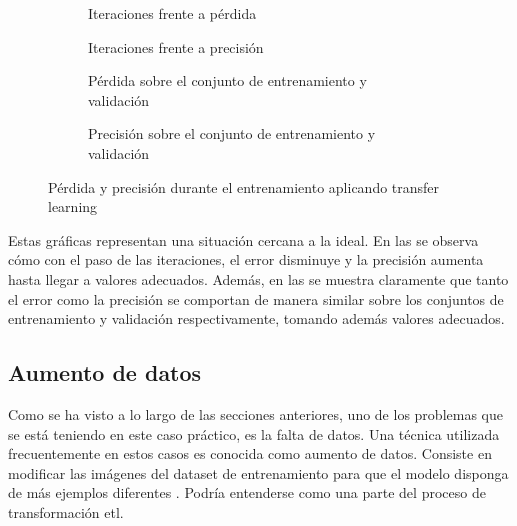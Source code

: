 			\begin{figure}[!h]
				\centering
				\begin{subfigure}{.4\textwidth}
					\centering
					
					\caption{Iteraciones frente a pérdida}
					\label{fig:tb_tl_a}
				\end{subfigure}\hfill
				\begin{subfigure}{.4\textwidth}
					\centering
					
					\caption{Iteraciones frente a precisión}
					\label{fig:tb_tl_b}
				\end{subfigure}
				\begin{subfigure}{.4\textwidth}
					\centering
					
					\caption{Pérdida sobre el conjunto de entrenamiento y validación}
					\label{fig:tb_tl_c}
				\end{subfigure}\hfill
				\begin{subfigure}{.4\textwidth}
					\centering
					
					\caption{Precisión sobre el conjunto de entrenamiento y validación}
					\label{fig:tb_tl_d}
				\end{subfigure}
				\caption{Pérdida y precisión durante el entrenamiento aplicando transfer learning}
				\label{fig:tb_tl}
			\end{figure}
			
			Estas gráficas representan una situación cercana a la ideal. En las  se observa cómo con el paso de las iteraciones, el error disminuye y la precisión aumenta hasta llegar a valores adecuados. Además, en las  se muestra claramente que tanto el error como la precisión se comportan de manera similar sobre los conjuntos de entrenamiento y validación respectivamente, tomando además valores adecuados. 
			
		\subsection{Aumento de datos}
		
			Como se ha visto a lo largo de las secciones anteriores, uno de los problemas que se está teniendo en este caso práctico, es la falta de datos. Una técnica utilizada frecuentemente en estos casos es conocida como aumento de datos. Consiste en modificar las imágenes del dataset de entrenamiento para que el modelo disponga de más ejemplos diferentes \cite{augm}. Podría entenderse como una parte del proceso de transformación \gls{etl}. \\
			
